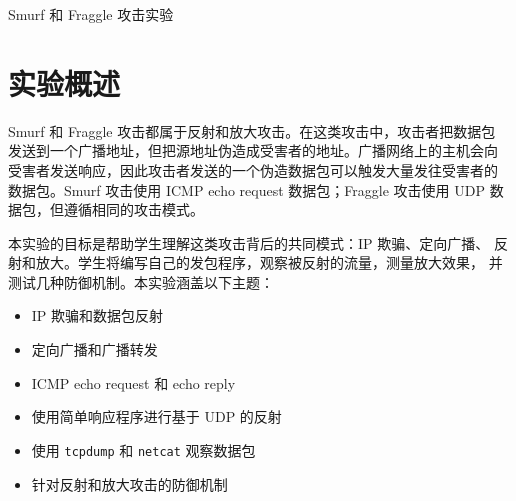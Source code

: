 
\newcommand{\commonfolder}{../../common-files}



\usepackage[fontset=fandol]{ctex}


\newcommand{\smurflab}{\texttt{Smurf/Fraggle}\xspace}
\newcommand{\attacker}{\texttt{AS-150}\xspace}
\newcommand{\victim}{\texttt{AS-151}\xspace}
\newcommand{\amplifier}{\texttt{AS-152}\xspace}
\newcommand{\fraggleport}{\texttt{7000}\xspace}



\begin{center}
{\LARGE Smurf 和 Fraggle 攻击实验}
\end{center}



\section{实验概述}

Smurf 和 Fraggle 攻击都属于反射和放大攻击。在这类攻击中，攻击者把数据包
发送到一个广播地址，但把源地址伪造成受害者的地址。广播网络上的主机会向
受害者发送响应，因此攻击者发送的一个伪造数据包可以触发大量发往受害者的
数据包。Smurf 攻击使用 ICMP echo request 数据包；Fraggle 攻击使用 UDP
数据包，但遵循相同的攻击模式。

本实验的目标是帮助学生理解这类攻击背后的共同模式：IP 欺骗、定向广播、
反射和放大。学生将编写自己的发包程序，观察被反射的流量，测量放大效果，
并测试几种防御机制。本实验涵盖以下主题：

\begin{itemize}[noitemsep]
\item IP 欺骗和数据包反射
\item 定向广播和广播转发
\item ICMP echo request 和 echo reply
\item 使用简单响应程序进行基于 UDP 的反射
\item 使用 \texttt{tcpdump} 和 \texttt{netcat} 观察数据包
\item 针对反射和放大攻击的防御机制
\end{itemize}


